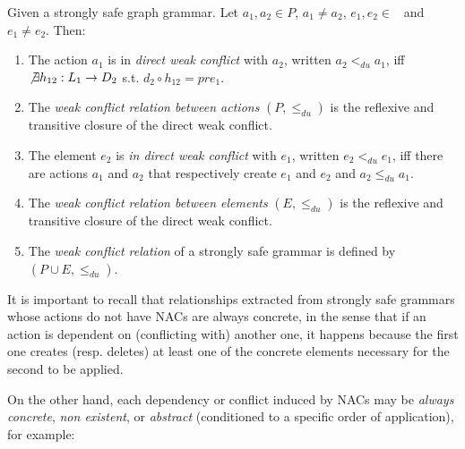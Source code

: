 \begin{definition} Given \doublyTypedGraphGrammarCore{} a strongly safe graph grammar. Let $a_1, a_2 \in P$, $a_1 \ne a_2$, \mbox{$e_1, e_2 \in $ \coreGraph{}} and $e_1 \ne e_2$. Then: 

  \begin{enumerate}
    \item The action $a_1$ is in \emph{direct weak conflict} with $a_2$, written $a_2 <_{du} a_1$, iff \mbox{$\not\exists h_{12} : L_1 \rightarrow D_2$} s.t. \mbox{$d_2 \circ h_{12} = pre_1$}.

   \item The \emph{weak conflict relation between actions} $(P,\leq_{du})$ is the reflexive and transitive closure of the direct weak conflict.
   \item The element $e_2$ is \emph{in direct weak conflict} with $e_1$, written $e_2 <_{du} e_1$, iff there are actions $a_1$ and $a_2$ that respectively create $e_1$ and $e_2$ and $a_2 \leq_{du} a_1$.
   \item The \emph{weak conflict relation between elements} $(E, \leq_{du})$ is the reflexive and transitive closure of the direct weak conflict.
   \item The \emph{weak conflict relation} of a strongly safe grammar is defined by $(P \cup E, \leq_{du})$.

  \end{enumerate}
\end{definition}

It is important to recall that relationships extracted from strongly safe grammars whose actions do not have NACs are always concrete, in the sense that if an action is dependent on (conflicting with) another one, it happens because the first one creates (resp. deletes) at least one of the concrete elements necessary for the second to be applied.

On the other hand, each dependency or conflict induced by NACs may be \emph{always concrete}, \emph{non existent}, or \emph{abstract} (conditioned to a specific order of application), for example: 

